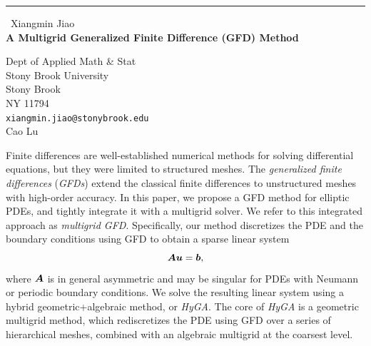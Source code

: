 \documentclass{report}
\begin{document}
\begin{center}
\rule{6in}{1pt} \
{\large Xiangmin Jiao \\
{\bf A Multigrid Generalized Finite Difference (GFD) Method}}

Dept of Applied Math \& Stat  \\ Stony Brook University \\ Stony Brook \\ NY 11794
\\
{\tt xiangmin.jiao@stonybrook.edu}\\
Cao Lu\end{center}

\renewcommand{\vec}[1]{\mbox{\boldmath $#1$}}

Finite differences are well-established numerical methods for solving
differential equations, but they were limited to structured meshes.
The \emph{generalized finite differences} (\emph{GFDs}) extend the
classical finite differences to unstructured meshes with high-order
accuracy. In this paper, we propose a GFD method for elliptic PDEs,
and tightly integrate it with a multigrid solver. We refer to this
integrated approach as \emph{multigrid GFD}. Specifically, our method
discretizes the PDE and the boundary conditions using GFD to obtain
a sparse linear system
\begin{equation}
\vec{A}\vec{u}=\vec{b},\label{eq:linearsys}
\end{equation}
where $\vec{A}$ is in general asymmetric and may be singular for
PDEs with Neumann or periodic boundary conditions. We solve the resulting
linear system using a hybrid geometric+algebraic method, or \emph{HyGA}.
The core of \emph{HyGA} is a geometric multigrid method, which rediscretizes
the PDE using GFD over a series of hierarchical meshes, combined with
an algebraic multigrid at the coarsest level.
\end{document}
